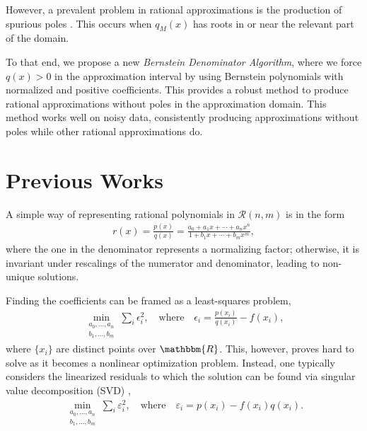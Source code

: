 \documentclass{article}
\begin{document}
{
However, a prevalent problem in rational approximations is the production of spurious poles  \cite{berrut_poleless_barycentric, barycentric_poleless, rational_fragile}. This occurs when $q_{M}(x)$ has roots in or near the relevant part of the domain.}

To that end, we propose a new \textit{Bernstein Denominator Algorithm}, where we force $q(x) > 0$ in the approximation interval by using Bernstein polynomials with normalized and positive coefficients. This provides a robust method to produce rational approximations without poles in the approximation domain. This method works well on noisy data, consistently producing approximations without poles while other rational approximations do. 

\section{Previous Works}
A simple way of representing rational polynomials in $\mathcal{R}(n, m)$ is in the form
\begin{eqnarray}\label{eq:normalized_rational_polynomial}
    r(x) = \frac{p(x)}{q(x)} = \frac{a_0 + a_1 x + \cdots + a_n x^n}{1 + b_1 x + \cdots + b_m x^m},
\end{eqnarray}
where the one in the denominator represents a normalizing factor; otherwise, it is invariant under rescalings of the numerator and denominator, leading to non-unique solutions.

Finding the coefficients can be framed as a least-squares problem, 
\begin{eqnarray}\label{eq:og_rational_problem}
    \min_{\substack{a_0,\ldots, a_n\\ b_1,\ldots, b_m}}\sum_i \epsilon_i^2, \quad \text{where} \quad \epsilon_i = \frac{p(x_i)}{q(x_i)} - f(x_i),
\end{eqnarray}
where $\{x_i\}$ are distinct points over $\mathbbm{R}$. This, however, proves hard to solve as it becomes a nonlinear optimization problem. Instead, one typically considers the linearized residuals to which the solution can be found via singular value decomposition (SVD) \cite{approximation_theory_and_practice},
\begin{eqnarray}
    \min_{\substack{a_0,\ldots, a_n\\ b_1,\ldots, b_m}}\sum_i \varepsilon_i^2, \quad \text{where} \quad \varepsilon_i = p(x_i) - f(x_i)q(x_i).
\end{eqnarray}
\end{document}
